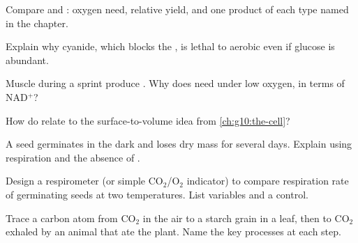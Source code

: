 \begin{exercise}[$\star$]\label{exo:g10:cellular-respiration:5}
Compare  and : oxygen need, relative 
yield, and one product of each  type named in the chapter.
\end{exercise}

\begin{exercise}[$\star\star$]\label{exo:g10:cellular-respiration:6}
Explain why cyanide, which blocks the , is lethal
to aerobic  even if glucose is abundant.
\end{exercise}

\begin{exercise}[$\star\star$]\label{exo:g10:cellular-respiration:7}
Muscle  during a sprint produce . Why does  need
 under low oxygen, in terms of NAD$^+$?
\end{exercise}

\begin{exercise}[$\star\star$]\label{exo:g10:cellular-respiration:8}
How do  relate to the surface-to-volume idea from
\cref{ch:g10:the-cell}?
\end{exercise}

\begin{exercise}[$\star\star$]\label{exo:g10:cellular-respiration:9}
A seed germinates in the dark and loses dry mass for several days. Explain
using respiration and the absence of .
\end{exercise}

\begin{exercise}[$\star\star\star$]\label{exo:g10:cellular-respiration:10}
Design a respirometer (or simple CO$_2$/O$_2$ indicator)  to
compare respiration rate of germinating seeds at two temperatures. List
variables and a control.
\end{exercise}

\begin{exercise}[$\star\star\star$]\label{exo:g10:cellular-respiration:11}
Trace a carbon atom from $\mathrm{CO_2}$ in the air to a starch grain in
a leaf, then to $\mathrm{CO_2}$ exhaled by an animal that ate the plant.
Name the key processes at each step.
\end{exercise}

